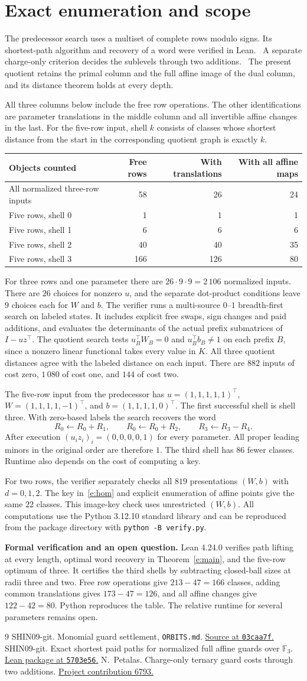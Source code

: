\documentclass[UTF8,a4paper,11pt,scheme=plain]{ctexart}
\makeatletter
\theoremstyle{zh}
\theoremstyle{plain}
\newcommand{\F}{\mathbb F_3}
\newcommand{\fivewitness}{R_0\gets R_0+R_1,\qquad R_0\gets R_0+R_2,\qquad R_3\gets R_3-R_4.}
\newcommand{\counttable}[6]{%
  \begin{center}
  \begingroup\small\setlength{\tabcolsep}{8pt}\renewcommand{\arraystretch}{1.18}
  \begin{tabular}{@{}lrrr@{}}
  \hline
  #1 & #2 & #3 & #4\\ \hline
  #5 & 58 & 26 & 24\\
  #6 0 & 1 & 1 & 1\\
  #6 1 & 6 & 6 & 6\\
  #6 2 & 40 & 40 & 35\\
  #6 3 & 166 & 126 & 80\\ \hline
  \end{tabular}
  \endgroup
  \end{center}}
\newcommand{\sources}[1]{%
  \begin{thebibliography}{9}\small
  \bibitem{#1orbits}
  SHIN09-git. Monomial guard settlement, \texttt{ORBITS.md}.
  \href{https://github.com/SHIN09-git/integer-mult-bounds/blob/03caa7f6cb5bd21c834024e9d81f6b43eb325b91/research/monomial-guard-settlement/ORBITS.md}{Source at \texttt{03caa7f}.}
  \bibitem{#1lean}
  SHIN09-git. Exact shortest paid paths for normalized full affine guards over $\F$.
  \href{https://github.com/SHIN09-git/integer-mult-bounds/blob/5703e56d6eb4b4f0a83af8c23a5d1dddd0b5474f/research/monomial-guard-orbit-lean/README.md}{Lean package at \texttt{5703e56}.}
  \bibitem{#1charge}
  N.~Petalas. Charge-only ternary guard costs through two additions.
  \href{https://github.com/CrocSwap/integer-mult-bounds/pull/6793}{Project contribution 6793.}
  \end{thebibliography}}
\makeatother
\begin{document}
\newpage
\section{Exact enumeration and scope}
The predecessor search uses a multiset of complete rows modulo signs. Its shortest-path
algorithm and recovery of a word were verified in Lean.~\cite{eorbits,elean} A separate
charge-only criterion decides the sublevels through two additions.~\cite{echarge} The present
quotient retains the primal column and the full affine image of the dual column, and its
distance theorem holds at every depth.

All three columns below include the free row operations. The other identifications are
parameter translations in the middle column and all invertible affine changes in the last.
For the five-row input, shell $k$ consists of classes whose shortest distance from the start
in the corresponding quotient graph is exactly $k$.
\counttable{Objects counted}{Free rows}{With translations}{With all affine maps}
  {All normalized three-row inputs}{Five rows, shell }

For three rows and one parameter there are $26\cdot9\cdot9=2\,106$ normalized inputs.
There are $26$ choices for nonzero $u$, and the separate dot-product conditions leave
$9$ choices each for $W$ and $b$. The verifier runs a multi-source $0$--$1$ breadth-first
search on labeled states. It includes explicit free swaps, sign changes and paid additions,
and evaluates the determinants of the actual prefix submatrices of $I-uz^\top$.
The quotient search tests $u_B^\top W_B=0$ and $u_B^\top b_B\ne1$ on each prefix $B$,
since a nonzero linear functional takes every value in $K$.
All three quotient distances agree with the labeled distance on each input. There are
$882$ inputs of cost zero, $1\,080$ of cost one, and $144$ of cost two.

The five-row input from the predecessor has $u=(1,1,1,1,1)^\top$,
$W=(1,1,1,1,-1)^\top$, and $b=(1,1,1,1,0)^\top$. The first successful shell is shell
three. With zero-based labels the search recovers the word
\[
  \fivewitness
\]
After execution $(u_i z_i)_i=(0,0,0,0,1)$ for every parameter. All proper leading minors in
the original order are therefore $1$. The third shell has 86 fewer classes. Runtime also
depends on the cost of computing a key.

For two rows, the verifier separately checks all $819$ presentations $(W,b)$ with
$d=0,1,2$. The key in~\eqref{e:hom} and explicit enumeration of affine points give the
same $22$ classes. This image-key check uses unrestricted $(W,b)$. All computations use
the Python 3.12.10 standard library and can be reproduced from the package directory with
\texttt{python -B verify.py}.

\medskip\noindent\textbf{Formal verification and an open question.}
Lean 4.24.0 verifies path lifting at every length, optimal word recovery in Theorem~\ref{e:main},
and the five-row optimum of three. It certifies the third shells by subtracting closed-ball sizes
at radii three and two. Free row operations give $213-47=166$ classes, adding common translations
gives $173-47=126$, and all affine changes give $122-42=80$. Python reproduces the table.
The relative runtime for several parameters remains open.
\sources{e}
\end{document}
